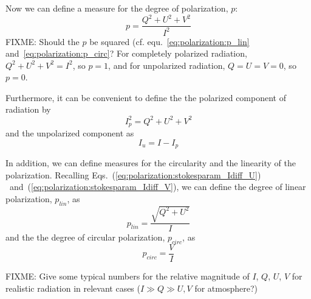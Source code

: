Now we can define a measure for the degree of polarization, $p$:
\begin{equation}
  \label{eq:polarization:pol_degree}
  p = \frac{Q^2 + U^2 + V^2}{I^2}
\end{equation}
FIXME: Should the $p$ be squared (cf. equ.~\ref{eq:polarization:p_lin}
and~\ref{eq:polarization:p_circ}?
For completely polarized radiation, $Q^2 + U^2 + V^2 = I^2$, so $p =
1$, and for unpolarized radiation, $Q = U = V = 0$, so $p = 0$.

Furthermore, it can be convenient to define the the polarized
component of radiation by
\begin{equation}
  \label{eq:polarization:pol_component}
  I_p^2 = Q^2 + U^2 + V^2
\end{equation}
and the unpolarized component as
\begin{equation}
  \label{eq:polarization:unpol_component}
  I_u = I - I_p
\end{equation}

In addition, we can define measures for the circularity and the
linearity of the polarization.
Recalling Eqs.~(\ref{eq:polarization:stokesparam_Idiff_U})%
~and~(\ref{eq:polarization:stokesparam_Idiff_V}),
we can define the degree of linear polarization, $p_{lin}$, as
\begin{equation}
  \label{eq:polarization:p_lin}
 p_{lin} = \frac{\sqrt{Q^2 + U^2}}{I} 
\end{equation}
and the the degree of circular polarization, $p_{circ}$, as
\begin{equation}
  \label{eq:polarization:p_circ}
 p_{circ} = \frac{V}{I} 
\end{equation}

FIXME: Give some typical numbers for the relative magnitude of $I$,
$Q$, $U$, $V$
for realistic radiation in relevant cases ($I \gg Q \gg U,V$ for
atmosphere?)




